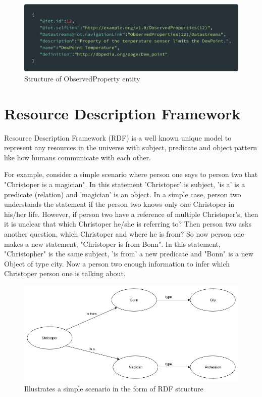 	\begin{figure}[!htbp] 
		\begin{center}
			\includegraphics[scale=0.1]{./images/png/ogc/observedproperty}	
			\caption{Structure of ObservedProperty entity}	
			\label{fig:observedproperty}	
		\end{center}
	\end{figure}


	\section{Resource Description Framework}

	Resource Description Framework (RDF) is a well known unique model to represent any resources in the universe with subject, predicate and object pattern like how humans communicate with each other.
	
	For example, consider a simple scenario where person one says to person two that "Christoper is a magician". In this statement 'Christoper' is subject, 'is a' is a predicate (relation) and 'magician' is an object. In a simple case, person two understands the statement if the person two knows only one Christoper in his/her life. However, if person two have a reference of multiple Christoper's, then it is unclear that which Christoper he/she is referring to? Then person two asks another question, which Christoper and where he is from? So now person one makes a new statement, "Christoper is from Bonn". In this statement, "Christopher" is the same subject, 'is from' a new predicate and "Bonn" is a new Object of type city. Now a person two enough information to infer which Christoper person one is talking about.
	
	\begin{figure}[!htbp] 
		\begin{center}
			\includegraphics[scale=0.5]{./images/png/rdf/uml_example}	
			\caption{Illustrates a simple scenario in the form of RDF structure}	
			\label{fig:uml_example}	
		\end{center}
	\end{figure}

